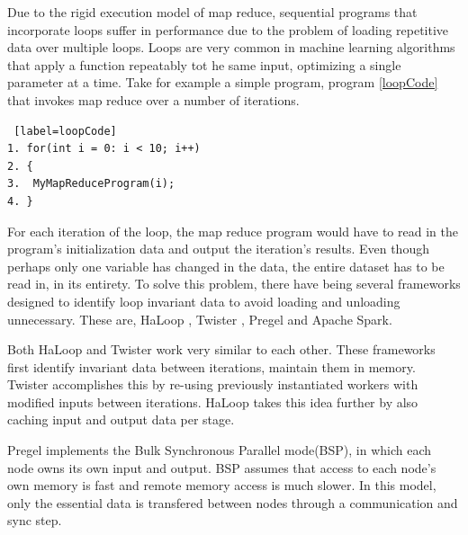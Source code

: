 \documentclass[10pt,twocolumn]{IEEEtran11}
\begin{document}
Due to the rigid execution model of map reduce, sequential programs that incorporate loops suffer in performance due to the problem of loading repetitive data over multiple loops. Loops are very common in machine learning algorithms that apply a function repeatably tot he same input, optimizing a single parameter at a time. Take for example a simple program, program \ref{loopCode} that invokes map reduce over a number of iterations.

\begin{lstlisting} [label=loopCode]
1. for(int i = 0: i < 10; i++)
2. {
3. 	MyMapReduceProgram(i);
4. }
\end{lstlisting}

For each iteration of the loop, the map reduce program would have to read in the program's initialization data and output the iteration's results.  Even though perhaps only one variable has changed in the data, the entire dataset has to be read in, in its entirety.  To solve this problem, there have being several frameworks designed to identify loop invariant data to avoid loading and unloading unnecessary.   These are, HaLoop \cite{bu2010haloop}, Twister \cite{ekanayake2010twister},  Pregel \cite{malewicz2010pregel} and Apache Spark\cite{zaharia2010spark}. 
\par
Both HaLoop and Twister work very similar to each other.  These frameworks first identify invariant data between iterations, maintain them in memory.  Twister accomplishes this by re-using previously instantiated workers with modified inputs between iterations.  HaLoop takes this idea further by also caching input and output data per stage.
\par
Pregel implements the Bulk Synchronous Parallel mode(BSP), in which each node owns its own input and output.  BSP assumes that access to each node's own memory is fast and remote memory access is much slower.  In this model, only the essential data is transfered between nodes through a communication and sync step.  
\end{document}
